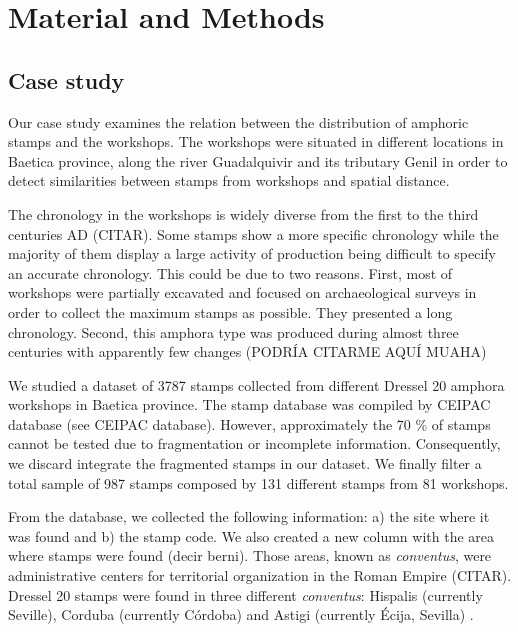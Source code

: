 \documentclass[review]{elsarticle}
\begin{document}




\section{Material and Methods}

\subsection{Case study}

Our case study examines the relation between the distribution of amphoric stamps and the workshops. The workshops were situated in different locations in Baetica province, along the river Guadalquivir and its tributary Genil in order to detect similarities between stamps from workshops and spatial distance. 

The chronology in the workshops is widely diverse from the first to the third centuries AD (CITAR). Some stamps show a more specific chronology while the majority of them display a large activity of production being difficult to specify an accurate chronology. This could be due to two reasons. First, most of workshops were partially excavated and focused on archaeological surveys in order to collect the maximum stamps as possible. They presented a long chronology. Second, this amphora type was produced during almost three centuries with apparently few changes (PODRÍA CITARME AQUÍ MUAHA)
 
We studied a dataset of 3787 stamps collected from different Dressel 20 amphora workshops in Baetica province. The stamp database was compiled by CEIPAC database \citep{remesal_centro_2015} (see CEIPAC database). However, approximately the 70 \% of stamps cannot be tested due to fragmentation or incomplete information. Consequently, we discard integrate the fragmented stamps in our dataset. We finally filter a total sample of 987 stamps composed by 131 different stamps from 81 workshops. 

From the database, we collected the following information: a) the site where it was found and b) the stamp code. We also created a new column with the area where stamps were found (decir berni). Those areas, known as \textit{conventus}, were administrative centers for territorial organization in the Roman Empire (CITAR). Dressel 20 stamps were found in three different \textit{conventus}: Hispalis (currently Seville), Corduba (currently C\'ordoba) and Astigi (currently Écija, Sevilla) \citep{rodriguez_economioleicola_1977,chic_datos_2001,berni_millet_epigrafianforica_2008} .
\end{document}

